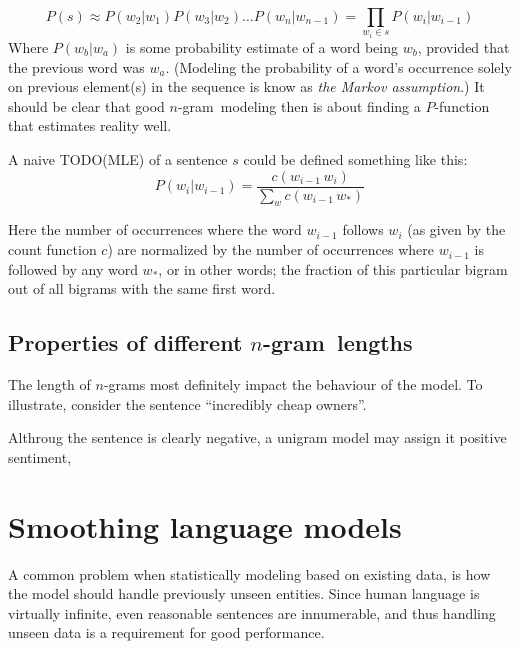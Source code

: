 \documentclass[a4paper,11pt]{kth-mag}
\newcommand{\ngram}{$n$-gram}
\newcommand{\gls}[1]{TODO(#1)}
\begin{document}
\begin{equation} \label{eq:bigram_chain_prob}
P(s) \approx P(w_2 | w_1)P(w_3 | w_2) \dots P(w_n | w_{n-1}) = \prod_{w_i \in s}P(w_i|w_{i-1})
\end{equation}
Where $P(w_b | w_a)$ is some probability estimate of a word being $w_b$, provided that the previous word was $w_a$. (Modeling the probability of a word's occurrence solely on previous element(s) in the sequence is know as \emph{the Markov assumption}.) It should be clear that good \ngram~modeling then is about finding a $P$-function that estimates reality well.

A naive \gls{MLE} of a sentence $s$ could be defined something like this:
\begin{equation} \label{eq:bigram_mle}
P(w_i|w_{i-1}) = \frac{c(w_{i-1}\,w_i)}{\sum_{w} c(w_{i-1}\, w_*)}
\end{equation}

Here the number of occurrences where the word $w_{i-1}$ follows $w_i$
(as given by the count function $c$) are normalized by the number of occurrences where $w_{i-1}$
is followed by any word $w_*$, or in other words; the fraction of this particular bigram
out of all bigrams with the same first word.

%




\subsection{Properties of different \ngram~lengths}

The length of \ngram s most definitely impact the behaviour of the model.
To illustrate, consider the sentence ``incredibly cheap owners''.

Althroug the sentence is clearly negative, a unigram model may assign it positive sentiment,

\section{Smoothing language models}
A common problem when statistically modeling based on existing data,
is how the model should handle previously unseen entities.
Since human language is virtually infinite, even reasonable sentences are innumerable,
and thus handling unseen data is a requirement for good performance.
\end{document}
